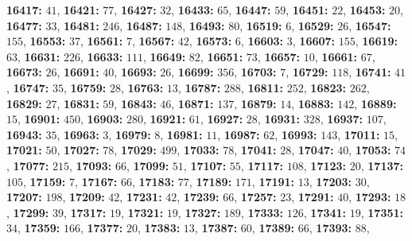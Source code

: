 \textsf{\bfseries 16417:} $41$, \textsf{\bfseries 16421:} $77$, \textsf{\bfseries 16427:} $32$, \textsf{\bfseries 16433:} $65$, \textsf{\bfseries 16447:} $59$, \textsf{\bfseries 16451:} $22$, \textsf{\bfseries 16453:} $20$, \textsf{\bfseries 16477:} $33$, \textsf{\bfseries 16481:} $246$, \textsf{\bfseries 16487:} $148$, \textsf{\bfseries 16493:} $80$, \textsf{\bfseries 16519:} $6$, \textsf{\bfseries 16529:} $26$, \textsf{\bfseries 16547:} $155$, \textsf{\bfseries 16553:} $37$, \textsf{\bfseries 16561:} $7$, \textsf{\bfseries 16567:} $42$, \textsf{\bfseries 16573:} $6$, \textsf{\bfseries 16603:} $3$, \textsf{\bfseries 16607:} $155$, \textsf{\bfseries 16619:} $63$, \textsf{\bfseries 16631:} $226$, \textsf{\bfseries 16633:} $111$, \textsf{\bfseries 16649:} $82$, \textsf{\bfseries 16651:} $73$, \textsf{\bfseries 16657:} $10$, \textsf{\bfseries 16661:} $67$, \textsf{\bfseries 16673:} $26$, \textsf{\bfseries 16691:} $40$, \textsf{\bfseries 16693:} $26$, \textsf{\bfseries 16699:} $356$, \textsf{\bfseries 16703:} $7$, \textsf{\bfseries 16729:} $118$, \textsf{\bfseries 16741:} $41$, \textsf{\bfseries 16747:} $35$, \textsf{\bfseries 16759:} $28$, \textsf{\bfseries 16763:} $13$, \textsf{\bfseries 16787:} $288$, \textsf{\bfseries 16811:} $252$, \textsf{\bfseries 16823:} $262$, \textsf{\bfseries 16829:} $27$, \textsf{\bfseries 16831:} $59$, \textsf{\bfseries 16843:} $46$, \textsf{\bfseries 16871:} $137$, \textsf{\bfseries 16879:} $14$, \textsf{\bfseries 16883:} $142$, \textsf{\bfseries 16889:} $15$, \textsf{\bfseries 16901:} $450$, \textsf{\bfseries 16903:} $280$, \textsf{\bfseries 16921:} $61$, \textsf{\bfseries 16927:} $28$, \textsf{\bfseries 16931:} $328$, \textsf{\bfseries 16937:} $107$, \textsf{\bfseries 16943:} $35$, \textsf{\bfseries 16963:} $3$, \textsf{\bfseries 16979:} $8$, \textsf{\bfseries 16981:} $11$, \textsf{\bfseries 16987:} $62$, \textsf{\bfseries 16993:} $143$, \textsf{\bfseries 17011:} $15$, \textsf{\bfseries 17021:} $50$, \textsf{\bfseries 17027:} $78$, \textsf{\bfseries 17029:} $499$, \textsf{\bfseries 17033:} $78$, \textsf{\bfseries 17041:} $28$, \textsf{\bfseries 17047:} $40$, \textsf{\bfseries 17053:} $74$, \textsf{\bfseries 17077:} $215$, \textsf{\bfseries 17093:} $66$, \textsf{\bfseries 17099:} $51$, \textsf{\bfseries 17107:} $55$, \textsf{\bfseries 17117:} $108$, \textsf{\bfseries 17123:} $20$, \textsf{\bfseries 17137:} $105$, \textsf{\bfseries 17159:} $7$, \textsf{\bfseries 17167:} $66$, \textsf{\bfseries 17183:} $77$, \textsf{\bfseries 17189:} $171$, \textsf{\bfseries 17191:} $13$, \textsf{\bfseries 17203:} $30$, \textsf{\bfseries 17207:} $198$, \textsf{\bfseries 17209:} $42$, \textsf{\bfseries 17231:} $42$, \textsf{\bfseries 17239:} $66$, \textsf{\bfseries 17257:} $23$, \textsf{\bfseries 17291:} $40$, \textsf{\bfseries 17293:} $18$, \textsf{\bfseries 17299:} $39$, \textsf{\bfseries 17317:} $19$, \textsf{\bfseries 17321:} $19$, \textsf{\bfseries 17327:} $189$, \textsf{\bfseries 17333:} $126$, \textsf{\bfseries 17341:} $19$, \textsf{\bfseries 17351:} $34$, \textsf{\bfseries 17359:} $166$, \textsf{\bfseries 17377:} $20$, \textsf{\bfseries 17383:} $13$, \textsf{\bfseries 17387:} $60$, \textsf{\bfseries 17389:} $66$, \textsf{\bfseries 17393:} $88$, 
